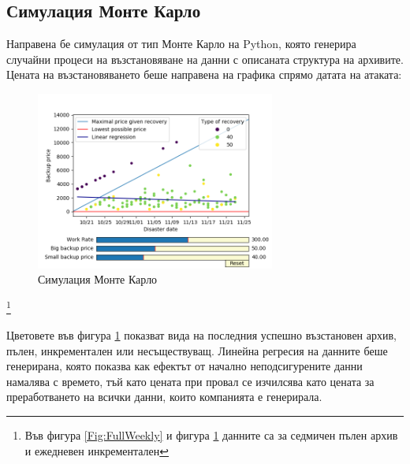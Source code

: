 \documentclass[11pt, a4paper]{article}
\theoremstyle{definition}
\newcommand\blfootnote[1]{%
	\begingroup
	\renewcommand\thefootnote{}\footnote{#1}%
	\addtocounter{footnote}{-1}%
	\endgroup
}
\begin{document}
			\subsection{Симулация Монте Карло}
				Направена бе симулация от тип Монте Карло на Python, която генерира случайни процеси на възстановяване на данни с описаната структура на архивите. Цената на възстановяването беше направена на графика спрямо датата на атаката:
				\begin{figure}[H]
					\begin{minipage}{1.0\textwidth}
						\centering
						\includegraphics[width=0.7\textwidth]{Weekly_full_carlo.png}
						\caption{Симулация Монте Карло}\label{Fig:MonteCarlo}
					\end{minipage}
				\end{figure}
				\blfootnote{Във фигура \ref{Fig:FullWeekly} и фигура \ref{Fig:MonteCarlo} данните са за седмичен пълен архив и ежедневен инкрементален}
				Цветовете във фигура \ref{Fig:MonteCarlo} показват вида на последния успешно възстановен архив, пълен, инкрементален или несъществуващ.
				Линейна регресия на данните беше генерирана, която показва как ефектът от начално неподсигурените данни намалява с времето, тъй като цената при провал се изчилсява като цената за преработването на всички данни, които компанията е генерирала.
\newpage
\end{document}
